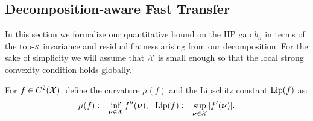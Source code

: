 \bigskip 

\subsection{Decomposition-aware Fast Transfer}\label{app:fast_transfer}
In this section we formalize our quantitative bound on the HP gap $b_n$ in terms of the top-$\kappa$ invariance and residual flatness arising from our decomposition. For the sake of simplicity we will assume that $\mathcal{X}$ is small enough so that the local strong convexity condition holds globally.
 \begin{definition}\label{def:curvature}
     For $f \in C^2(\mathcal{X})$, define the curvature $\mu(f)$ and the Lipschitz constant $\mathrm{Lip}(f)$ as:
\[
\mu(f) := \inf_{\bm{\nu} \in \mathcal{X}} f''(\bm{\nu}),~~\mathrm{Lip}(f) := \sup_{\bm{\nu} \in \mathcal{X}} |f'(\bm{\nu})|.
\]
 \end{definition}

